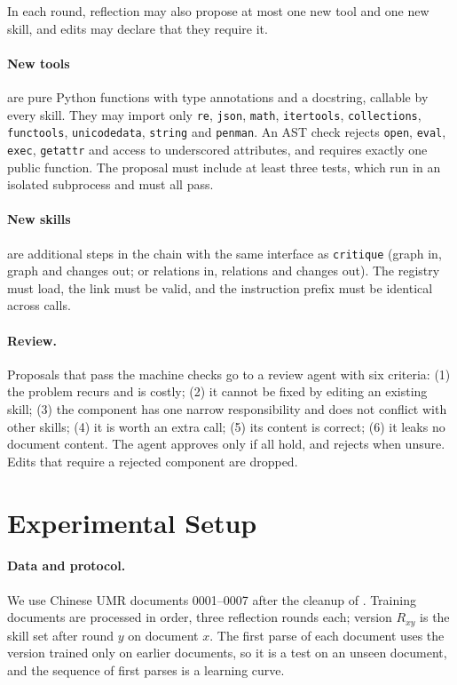\documentclass[11pt]{article}
\newcommand{\umr}{\textsc{UMR}\xspace}
\newcommand{\skill}[1]{\texttt{#1}}
\begin{document}
In each round, reflection may also propose at most one new tool and one new skill, and edits may declare that they require it.

\paragraph{New tools} are pure Python functions with type annotations and a docstring, callable by every skill. They may import only \texttt{re}, \texttt{json}, \texttt{math}, \texttt{itertools}, \texttt{collections}, \texttt{functools}, \texttt{unicodedata}, \texttt{string} and \texttt{penman}. An AST check rejects \texttt{open}, \texttt{eval}, \texttt{exec}, \texttt{getattr} and access to underscored attributes, and requires exactly one public function. The proposal must include at least three tests, which run in an isolated subprocess and must all pass.

\paragraph{New skills} are additional steps in the chain with the same interface as \skill{critique} (graph in, graph and changes out; or relations in, relations and changes out). The registry must load, the link must be valid, and the instruction prefix must be identical across calls.

\paragraph{Review.} Proposals that pass the machine checks go to a review agent with six criteria: (1) the problem recurs and is costly; (2) it cannot be fixed by editing an existing skill; (3) the component has one narrow responsibility and does not conflict with other skills; (4) it is worth an extra call; (5) its content is correct; (6) it leaks no document content. The agent approves only if all hold, and rejects when unsure. Edits that require a rejected component are dropped.

\section{Experimental Setup}

\paragraph{Data and protocol.}
We use Chinese \umr documents 0001--0007 after the cleanup of \citet{chun2024pipeline}. Training documents are processed in order, three reflection rounds each; version $R_{xy}$ is the skill set after round $y$ on document $x$. The first parse of each document uses the version trained only on earlier documents, so it is a test on an unseen document, and the sequence of first parses is a learning curve.
\end{document}
